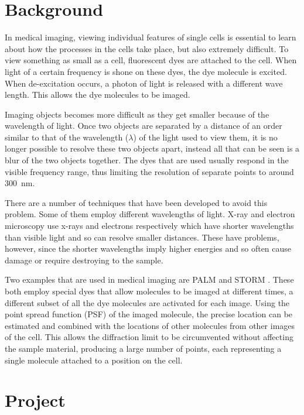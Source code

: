 
\section{Background}
\label{sec:background}

In medical imaging, viewing individual features of single cells is essential to
learn about how the processes in the cells take place, but also extremely
difficult. To view something as small as a cell, fluorescent dyes are attached
to the cell. When light of a certain frequency is shone on these dyes, the dye
molecule is excited. When de-excitation occurs, a photon of light is released
with a different wave length. This allows the dye molecules to be imaged.

Imaging objects becomes more difficult as they get smaller because of the
wavelength of light. Once two objects are separated by a distance of an order
similar to that of the wavelength ($\lambda$) of the light used to view them,
it is no longer possible to resolve these two objects apart, instead all that
can be seen is a blur of the two objects together. The dyes that are used
usually respond in the visible frequency range, thus limiting the resolution of
separate points to around \SI{300}{\nano\metre}.

There are a number of techniques that have been developed to avoid this
problem. Some of them employ different wavelengths of light. X-ray and electron
microscopy use x-rays and electrons respectively which have shorter wavelengths
than visible light and so can resolve smaller distances. These have problems,
however, since the shorter wavelengths imply higher energies and so often
cause damage or require destroying to the sample.

Two examples that are used in medical imaging are PALM \cite{owen2010palm} and
STORM \cite{rust2006sub}. These both employ special dyes that allow molecules to
be imaged at different times, a different subset of all the dye molecules are
activated for each image. Using the point spread function (PSF) of the imaged
molecule, the precise location can be estimated and combined with the locations
of other molecules from other images of the cell. This allows the diffraction
limit to be circumvented without affecting the sample material, producing a
large number of points, each representing a single molecule attached to a
position on the cell.

\section{Project}
\label{sec:project}

